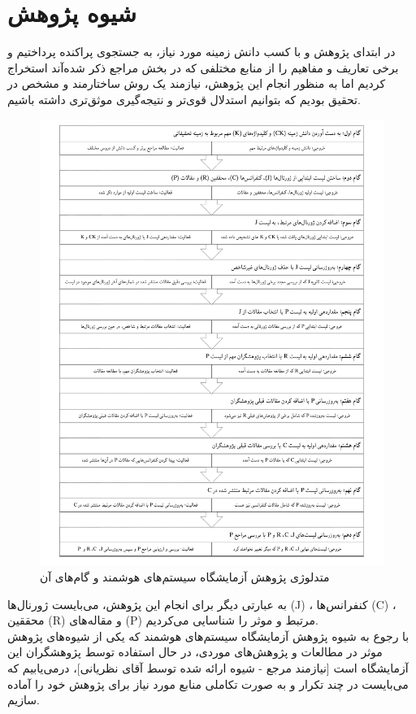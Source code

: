 \chapter{شیوه پژوهش‌}
در ابتدای پژوهش و با کسب دانش ‌زمینه مورد نیاز، به جستجوی پراکنده پرداختیم و برخی تعاریف و مفاهیم را از منابع مختلفی که در بخش مراجع ذکر شده‌آند استخراج کردیم اما به منظور انجام این پژوهش، نیازمند یک روش ساختارمند و مشخص در تحقیق بودیم که بتوانیم استدلال قوی‌تر و نتیجه‌گیری موثق‌تری داشته باشیم.
\begin{figure}[H]
	\centering\includegraphics[width=0.95\linewidth]{Resources/ISLAB_methodology.pdf}
	\caption{متدلوژی پژوهش آزمایشگاه سیستم‌های هوشمند و گام‌های آن}
	\label{fig:islab}
\end{figure}
به عبارتی دیگر برای انجام این پژوهش، می‌بایست ژورنال‌ها (J) ، کنفرانس‌ها (C) ، محققین‌ (R) و مقاله‌های (P) مرتبط و موثر را شناسایی می‌کردیم.\\
با رجوع به شیوه پژوهش آزمایشگاه سیستم‌های هوشمند
که یکی از  شیوه‌های پژوهش موثر در مطالعات و پژوهش‌های موردی، در حال استفاده توسط پژوهشگران این آزمایشگاه است [نیازمند مرجع - شیوه ارائه شده توسط آقای نظریانی]، درمی‌یابیم که می‌بایست در چند تکرار و به صورت تکاملی منابع مورد نیاز برای پژوهش خود را آماده سازیم.\\
